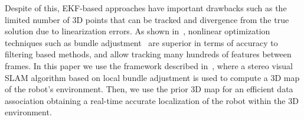 Despite of this, EKF-based approaches have important drawbacks such as the limited number of 3D points that can be
tracked and divergence from the true solution due to linearization errors. As shown in~\cite{Strasdat10icra}, nonlinear
optimization techniques such as bundle adjustment~\cite{Mouragnon09ivc} are superior in terms of accuracy to filtering based methods, and
allow tracking many hundreds of features between frames. In this paper we use the framework described in~\cite{Alcantarilla12auro}, where a stereo visual SLAM algorithm based on local bundle adjustment is used to compute a 3D map of the robot's environment. Then, we use the prior 3D map for an efficient data association obtaining a real-time accurate localization of the robot within the 3D environment.

